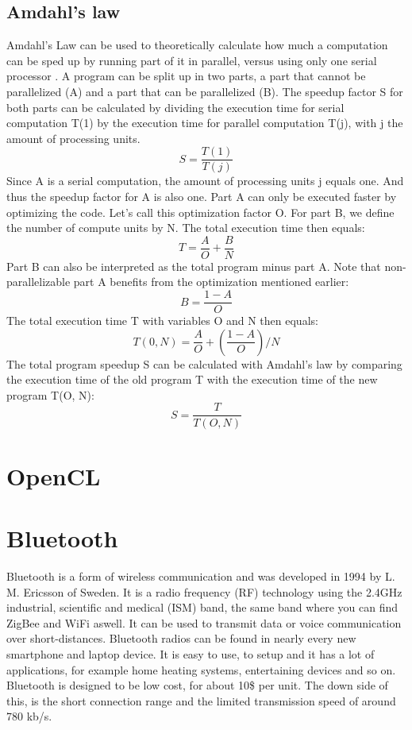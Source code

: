 \documentclass[a4paper, 11pt]{report}
\begin{document}
	\subsection{Amdahl's law}
Amdahl's Law can be used to theoretically calculate how much a computation can be sped up by running part of it in parallel, versus using only one serial processor \cite{amdahlslaw}. A program can be split up in two parts, a part that cannot be parallelized (A) and a part that can be parallelized (B). The speedup factor S for both parts can be calculated by dividing the execution time for serial computation T(1) by the execution time for parallel computation T(j), with j the amount of processing units.
\begin{equation}
	S = \frac{T(1)}{T(j)}
\end{equation}
Since A is a serial computation, the amount of processing units j equals one. And thus the speedup factor for A is also one. Part A can only be executed faster by optimizing the code. Let's call this optimization factor O. For part B, we define the number of compute units by N. The total execution time then equals:
\begin{equation}
	T = \frac{A}{O} + \frac{B}{N}	
\end{equation}
Part B can also be interpreted as the total program minus part A. Note that non-parallelizable part A benefits from the optimization mentioned earlier:
\begin{equation}
	B = \frac{1-A}{O}
\end{equation}
The total execution time T with variables O and N then equals:
\begin{equation}
	T(0, N) = \frac{A}{O} + (\frac{1-A}{O})/N
\end{equation}
The total program speedup S can be calculated with Amdahl's law by comparing the execution time of the old program T with the execution time of the new program T(O, N):
\begin{equation}
	S  = \frac{T}{T(O, N)}
\end{equation}


\section{OpenCL}\label{subsec:OpenCL}
	
\section{Bluetooth}
Bluetooth is a form of wireless communication and was developed in 1994 by L. M. Ericsson of Sweden. It is a radio frequency (RF) technology using the 2.4GHz industrial, scientific and medical (ISM) band, the same band where you can find ZigBee and WiFi aswell. It can be used to transmit data or voice communication over short-distances. Bluetooth radios can be found in nearly every new smartphone and laptop device. It is easy to use, to setup and it has a lot of applications, for example home heating systems, entertaining devices and so on. Bluetooth is designed to be low cost, for about 10\$ per unit. The down side of this, is the short connection range and the limited transmission speed of around 780 kb/s\cite{bluetoothTech}.\\
\end{document}
